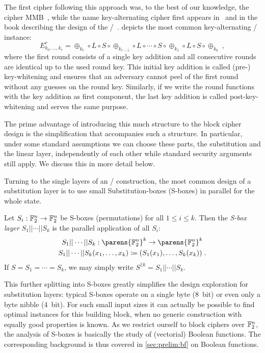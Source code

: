 The first cipher following this approach was, to the best of our knowledge, the cipher MMB~\cite{DaeGovVan93}, while the name key-alternating cipher first appears in~\cite{IMA:DaeRij01} and in the book describing the design of the \AES/~\cite{rijndael_book}.
 depicts the most common key-alternating \SPN/ instance:
\begin{equation*}
    E_{k_0,\ldots,k_r}^r = \oplus_{k_r} \circ L \circ S \circ \oplus_{k_{r-1}} \circ L \circ \cdots \circ S \circ \oplus_{k_1} \circ L \circ S \circ \oplus_{k_0}\;,
\end{equation*}
where the first round consists of a single key addition and all consecutive rounds are identical up to the used round key.
This initial key addition is called (pre-) key-whitening and ensures that an adversary cannot peel of the first round without any guesses on the round key.
Similarly, if we write the round functions with the key addition as first component, the last key addition is called post-key-whitening and serves the same purpose.

The prime advantage of introducing this much structure to the block cipher design is the simplification that accompanies such a structure.
In particular, under some standard assumptions we can choose these parts, the substitution and the linear layer, independently of each other while standard security arguments still apply.
We discuss this in more detail below.

Turning to the single layers of an \SPN/ construction, the most common design of a substitution layer is to use small Substitution-boxes (S-boxes) in parallel for the whole state.
\begin{definition}
    Let $S_i : \mathbb{F}_2^n \to \mathbb{F}_2^n$ be S-boxes (permutations) for all $1 \leqslant i \leqslant k$.
    Then the \emph{S-box layer} $S_1 || \cdots || S_k$ is the parallel application of all $S_i$:
    \begin{gather*}
        S_1 || \cdots || S_k : \parens{\F_2^n}^k \to \parens{\F_2^n}^k \\
        S_1 || \cdots || S_k(x_1, \ldots, x_k) \coloneqq (S_1(x_1), \ldots, S_k(x_k))\;.
    \end{gather*}
    If $S = S_1 = \cdots = S_k$, we may simply write $S^{||k} = S_1 || \cdots || S_k$.
\end{definition}
This further splitting into S-boxes greatly simplifies the design exploration for substitution layers: typical S-boxes operate on a single byte (8~bit) or even only a byte nibble (4~bit).
For such small input sizes it can actually be possible to find optimal instances for this building block, when no generic construction with equally good properties is known.
As we restrict ourself to block ciphers over $\mathbb{F}_2^n$, the analysis of S-boxes is basically the study of (vectorial) Boolean functions.
The corresponding background is thus covered in \cref{sec:prelim:bf} on Boolean functions.

